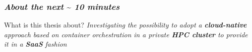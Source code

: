 \begin{frame}
  \frametitle{ \textit{About the next }\sim \textit{ 10 minutes}}
  \begin{block}{ What is this thesis about?}
    \textit{
      Investigating the possibility to adopt a \alert{\textbf{cloud-native}} approach based on
      container orchestration in a private \alert{\textbf{HPC cluster}} to provide it in a \textbf{SaaS}
      fashion
%
    }
  \end{block}
\end{frame}

